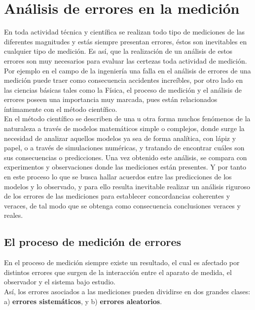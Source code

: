 \chapter{Análisis de errores en la medición}

En toda actividad técnica y científica se realizan todo tipo de mediciones de las diferentes magnitudes y estás siempre 
presentan errores, éstos son inevitables en cualquier tipo de medición. Es así, que la realización de un análisis de estos 
errores son muy necesarios para evaluar las certezas toda actividad de medición. Por ejemplo en el campo de la ingeniería una 
falla en el análisis de errores de una medición puede traer como consecuencia accidentes increíbles, por otro lado 
 en las ciencias básicas tales como la Física, el proceso de medición y el análisis de errores poseen una importancia muy 
marcada, pues están relacionados íntimamente con el método científico.\\

En el método científico se describen de una u otra forma muchos fenómenos de la naturaleza a través de modelos matemáticos 
simple o complejos, donde surge la necesidad de analizar aquellos  modelos ya sea de forma analítica, con lápiz y papel, o a 
través de simulaciones numéricas, y tratando de encontrar cuáles son sus consecuencias o predicciones. Una vez obtenido este 
análisis, se compara con experimentos y observaciones donde las mediciones están presentes. Y por tanto en este proceso lo que se 
busca hallar acuerdos entre las predicciones de los modelos y lo observado, y para ello resulta inevitable realizar un análisis 
riguroso de los errores de las mediciones para establecer concordancias coherentes y veraces, de tal modo que se obtenga como 
consecuencia conclusiones veraces y reales.

\section{El proceso de medición de errores}

En el proceso de medición siempre existe un resultado, el cual es afectado por distintos errores que surgen de la interacción 
entre el aparato de medida, el observador y el sistema bajo estudio.\\ 

Así, los errores asociados a las mediciones pueden dividirse en dos grandes clases: a) \textbf{errores sistemáticos}, y b) 
\textbf{errores aleatorios}.\\


